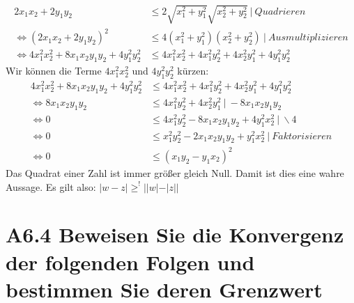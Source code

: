 \documentclass{article}
\begin{document}
\begin{enumerate}[ label = (\alph*) ]
\begin{enumerate}
\begin{align*}
                2 x_1 x_2 + 2 y_1 y_2 & \leq 2 \sqrt{ x_1^2 + y_1^2 } \sqrt{ x_2^2 + y_2^2 } \ | \ Quadrieren \\
                \Leftrightarrow {\left( 2 x_1 x_2 + 2 y_1 y_2 \right)}^2 & \leq 4 (x_1^2 + y_1^2) (x_2^2 + y_2^2) \ | \ Ausmultiplizieren \\
                \Leftrightarrow 4 x_1^2 x_2^2 + 8 x_1 x_2 y_1 y_2 + 4 y_1^2 y_2^2 & \leq 4 x_1^2 x_2^2 + 4 x_1^2 y_2^2 + 4 x_2^2 y_1^2 + 4 y_1^2 y_2^2
            \end{align*}
            Wir können die Terme \(4 x_1^2 x_2^2\) und \(4 y_1^2 y_2^2\) kürzen:
            \begin{align*}
                4 x_1^2 x_2^2 + 8 x_1 x_2 y_1 y_2 + 4 y_1^2 y_2^2 & \leq 4 x_1^2 x_2^2 + 4 x_1^2 y_2^2 + 4 x_2^2 y_1^2 + 4 y_1^2 y_2^2 \\
                \Leftrightarrow 8 x_1 x_2 y_1 y_2 & \leq 4 x_1^2 y_2^2 + 4 x_2^2 y_1^2 \ | \ - 8 x_1 x_2 y_1 y_2 \\
                \Leftrightarrow 0 & \leq 4 x_1^2 y_2^2 - 8 x_1 x_2 y_1 y_2 + 4 y_1^2 x_2^2 \ | \ \backslash 4 \\
                \Leftrightarrow 0 & \leq x_1^2 y_2^2 - 2 x_1 x_2 y_1 y_2 + y_1^2 x_2^2\ | \ Faktorisieren \\
                \Leftrightarrow 0 & \leq {(x_1 y_2 - y_1 x_2)}^2
            \end{align*}
            Das Quadrat einer Zahl ist immer größer gleich Null. Damit ist dies eine wahre Aussage.
            Es gilt also: \( |w-z| \geq^! ||w|-|z|| \) \\
        \end{enumerate}

        \section*{A6.4 Beweisen Sie die Konvergenz der folgenden Folgen und bestimmen Sie deren Grenzwert}
        \begin{enumerate}[ label = (\roman*) ]


\end{enumerate}
\end{enumerate}
\end{document}
